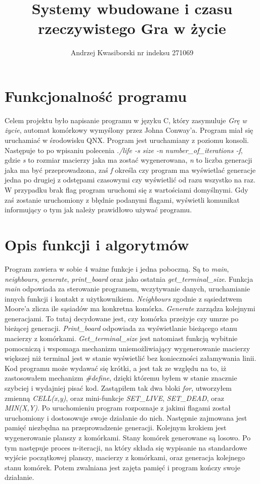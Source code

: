 \documentclass[a4paper,11pt]{article}
\author{Andrzej Kwasiborski nr indeksu 271069}
\title{Systemy wbudowane i czasu rzeczywistego \linebreak[1] Gra w życie}
\begin{document}
\maketitle
\tableofcontents
\section{Funkcjonalność programu}
Celem projektu było napisanie programu w języku C, który zasymuluje \textit{Grę w życie}, automat komórkowy wymyślony przez Johna Conway'a. Program miał się uruchamiać w środowisku QNX. \newline
Program jest uruchamiany z poziomu konsoli. Następuje to po wpisaniu polecenia \textit{./life -s size -n number\_of\_iterations -f}, gdzie \textit{s} to rozmiar macierzy jaka ma zostać wygenerowana, \textit{n} to liczba generacji jaka ma być przeprowadzona, zaś \textit{f} określa czy program ma wyświetlać generacje jedna po drugiej z odstępami czasowymi czy wyświetlić od razu wszystko na raz. W przypadku brak flag program uruchomi się z wartościami domyślnymi. Gdy zaś zostanie uruchomiony z błędnie podanymi flagami, wyświetli komunikat informujący o tym jak należy prawidłowo używać programu.
\section{Opis funkcji i algorytmów}
Program zawiera w sobie 4 ważne funkcje i jedna poboczną. Są to \textit{main}, \textit{neighbours}, \textit{generate}, \textit{print\_board} oraz jako ostatnia \textit{get\_terminal\_size}. Funkcja \textit{main} odpowiada za sterowanie programem, wczytywanie danych, uruchamianie innych funkcji i kontakt z użytkownikiem. \textit{Neighbours} zgodnie z sąsiedztwem Moore'a zlicza ile sąsiadów ma konkretna komórka. \textit{Generate} zarządza kolejnymi generacjami. To tutaj decydowane jest, czy komórka przeżyje czy umrze po bieżącej generacji. \textit{Print\_board} odpowiada za wyświetlanie bieżącego stanu macierzy z komórkami. \textit{Get\_terminal\_size} jest natomiast funkcją wybitnie pomocniczą i wspomaga mechanizm uniemożliwiający wygenerowanie macierzy większej niż terminal jest w stanie wyświetlić bez konieczności załamywania linii.\newline
Kod programu może wydawać się krótki, a jest tak ze względu na to, iż zastosowałem mechanizm \textit{\#define}, dzięki któremu byłem w stanie znacznie szybciej i wydajniej pisać kod. Zastąpiłem tak dwa bloki \textit{for}, utworzyłem zmienną \textit{CELL(x,y)}, oraz mini-funkcje \textit{SET\_LIVE}, \textit{SET\_DEAD}, oraz \textit{MIN(X,Y)}.\newline
Po uruchomieniu program rozpoznaje z jakimi flagami został uruchomiony i dostosowuje swoje działanie do nich. Następnie zajmowana jest pamięć niezbędna na przeprowadzenie generacji. Kolejnym krokiem jest wygenerowanie planszy z komórkami. Stany komórek generowane są losowo. Po tym następuje proces n-iteracji, na który składa się wypisanie na standardowe wyjście początkowej planszy, macierzy z komórkami, oraz generacja kolejnego stanu komórek. Potem zwalniana jest zajęta pamięć i program kończy swoje działanie.  
\end{document}

